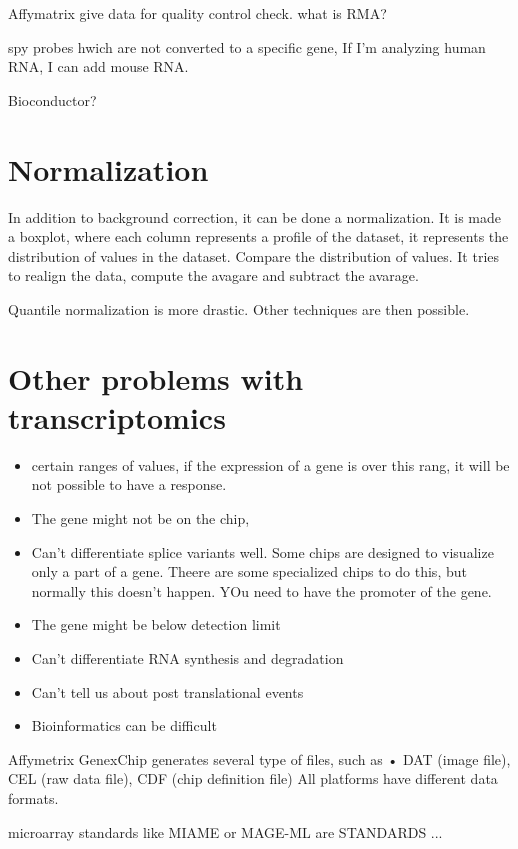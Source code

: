 Affymatrix give data for quality control check.   
what is RMA?  %

spy probes hwich are not converted to a specific gene, If I'm analyzing human RNA, I can add mouse RNA.






Bioconductor?


\section{Normalization}
In addition to background correction, it can be done a normalization. It is made a boxplot, where each column represents a profile of the dataset, it represents the distribution of values in the dataset. Compare the distribution of values. It tries to realign the data, compute the avagare and subtract the avarage. 

Quantile normalization is more drastic. Other techniques are then possible.



\section{Other problems with transcriptomics}
\begin{itemize}
	\item certain ranges of values, if the expression of a gene is over this rang, it will be not possible to have a response.
	\item The gene might not be on the chip, 
	\item Can’t differentiate splice variants well. Some chips are designed to visualize only a part of a gene. Theere  are some specialized chips to do this, but normally this doesn't happen. YOu need to have the promoter of the gene. 
	\item The gene might be below detection limit
	\item Can’t differentiate RNA synthesis and degradation
	\item Can’t tell us about post translational events
	\item Bioinformatics can be difficult
\end{itemize}


Affymetrix GenexChip generates several type of files, such as •
DAT (image file), 
CEL (raw data file), 
CDF (chip definition file)
All platforms have different data formats. 

microarray standards like MIAME or MAGE-ML are STANDARDS ... %




